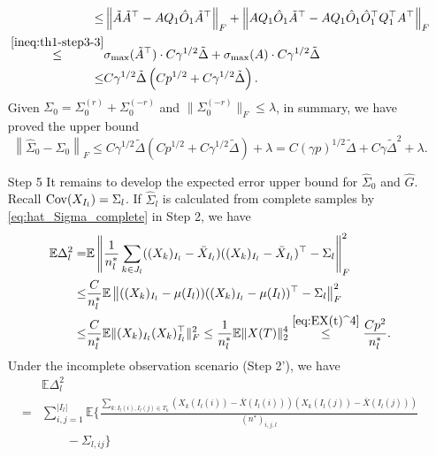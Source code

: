 \documentclass[11pt]{article}
\newcommand{\0}{{\mathbf{0}}}
\newcommand{\1}{{\mathbf{1}}}
\newcommand{\Cov}{{\rm Cov}}
\begin{document}
\begin{enumerate}[leftmargin=*]
\begin{equation}
\begin{split}
	\leq & \left\|\tilde{A}\tilde{A}^\top - AQ_1\hat{O}_1\tilde{A}^\top\right\|_F + \left\|AQ_1\hat{O}_1\tilde{A}^\top - AQ_1\hat{O}_1\hat{O}_1^\top Q_1^\top A^\top \right\|_F\\
	\overset{\eqref{ineq:th1-step3-3}}{\leq} & \sigma_{\max}(\tilde{A}^\top) \cdot C\gamma^{1/2}\tilde{\Delta} + \sigma_{\max}(A) \cdot C\gamma^{1/2}\tilde{\Delta}\\
	\leq & C\gamma^{1/2}\tilde{\Delta}\left(Cp^{1/2}+C\gamma^{1/2}\tilde{\Delta}\right).
	\end{split}
	\end{equation}
	Given $\Sigma_0 = \Sigma_0^{(r)} + \Sigma_0^{(-r)}$ and $\|\Sigma_0^{(-r)}\|_F\leq \lambda$, 
	in summary, we have proved the upper bound
	$$\left\|\hat{\Sigma}_0 - \Sigma_0\right\|_F \leq C\gamma^{1/2}\tilde{\Delta}\left(Cp^{1/2}+C\gamma^{1/2}\tilde{\Delta}\right) + \lambda = C(\gamma p)^{1/2}\tilde{\Delta} + C\gamma \tilde{\Delta}^2 + \lambda.$$
	\item[Step 5] It remains to develop the expected error upper bound for $\hat{\Sigma}_0$ and $\hat{G}$. Recall $\Cov(X_{I_l}) = \Sigma_l$. If $\hat{\Sigma}_l$ is calculated from complete samples by \eqref{eq:hat_Sigma_complete} in Step 2, we have
	\begin{equation}\label{ineq:EDelta_l}
	\begin{split}
	\mathbb{E}\Delta_l^2 = & \mathbb{E}\left\|\frac{1}{n_l^\ast}\sum_{k\in J_l}((X_k)_{I_l} - \bar{X}_{I_l})((X_k)_{I_l} - \bar{X}_{I_l})^\top - \Sigma_l\right\|_F^2 \\
	\leq & \frac{C}{n_l^\ast} \mathbb{E} \left\|((X_k)_{I_l} - \mu(I_l))((X_k)_{I_l} - \mu(I_l))^\top - \Sigma_l\right\|_F^2 \\
	\leq & \frac{C}{n_l^\ast} \mathbb{E} \|(X_k)_{I_l}(X_k)_{I_l}^\top\|_F^2 \leq \frac{1}{n_l^\ast}\mathbb{E}\|X(T)\|_2^4 \overset{\eqref{eq:EX(t)^4}}{\leq} \frac{Cp^2}{n_l^\ast}.
	\end{split}
	\end{equation}
	Under the incomplete observation scenario (Step 2'), we have
	\begin{equation}\label{ineq:EDelta_l-incomplete}
	\begin{split}
	& \mathbb{E}\Delta_l^2 \\
	= & \sum_{i, j =1}^{|I_l|}\mathbb{E} \Bigg\{\frac{\sum_{k: I_l(i), I_l(j) \in T_k} \left(X_k(I_l(i)) - \bar{X}(I_l(i))\right)\left(X_k(I_l(j)) - \bar{X}(I_l(j))\right)}{(n^\ast)_{i,j,l}} \\
	& \qquad - \Sigma_{l, ij}\Bigg\}\\

\end{split}
\end{equation}
\end{enumerate}
\end{document}
